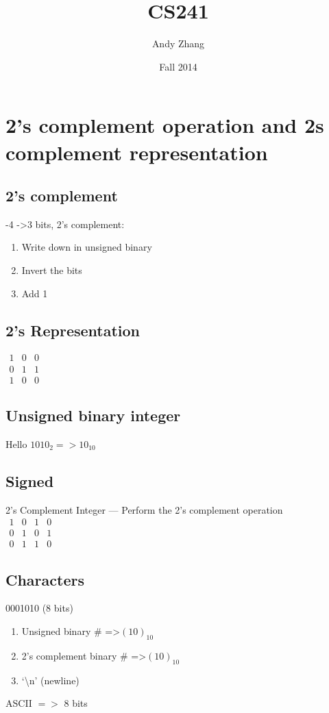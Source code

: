 \documentclass[12pt]{report}
\title{CS241}
\author{{Andy Zhang}}
\date{{Fall 2014}}
\begin{document}
\maketitle
\tableofcontents
\section{2's complement operation and 2s complement representation}
  \subsection{2's complement}
    -4 -\textgreater 3 bits, 2's complement:
    \begin{enumerate}
      \item Write down in unsigned binary
      \item Invert the bits
      \item Add 1
    \end{enumerate}

  \subsection{2's Representation}
    $
      \begin{matrix}
        1 & 0 & 0\\
        0 & 1 & 1\\
        1 & 0 & 0
      \end{matrix}
    $

  \subsection{Unsigned binary integer}
  Hello
    $1010_2 => 10_{10}$
  \subsection{Signed}
    2's Complement Integer --- Perform the 2's complement operation\\
    $
    \begin{matrix}
      1 & 0 & 1 & 0\\
      0 & 1 & 0 & 1\\
      0 & 1 & 1 & 0
    \end{matrix}
    $

    \subsection{Characters}
      0001010 (8 bits)
      \begin{enumerate}
        \item Unsigned binary \# =\textgreater $(10)_{10}$
        \item 2's complement binary \# =\textgreater $(10)_{10}$
        \item `\textbackslash n' (newline)
      \end{enumerate}
      ASCII $=>$ 8 bits
\end{document}
